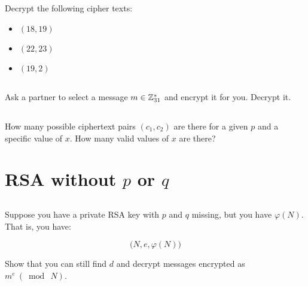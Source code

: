 \documentclass[12pt]{article}
\begin{document}
Decrypt the following cipher texts:

\begin{itemize}
\item $(18, 19)$ 
\item $(22, 23)$ 
\item $(19, 2)$ 
\end{itemize}

\subsection{}


Ask a partner to select a message $m \in \mathbb{Z}_{31}^*$ and encrypt it for you. Decrypt it.

\subsection{}

How many possible ciphertext pairs $(c_1, c_2)$ are there for a given $p$ and a specific value of $x$. How many valid values of $x$ are there?



\section{RSA without $p$ or $q$}

\subsection{}


\label{rsa_p_q}

Suppose you have a private RSA key with $p$ and $q$ missing, but you have $\varphi(N)$. That is, you have:

$$\Big(N, e, \varphi(N)\Big)$$

Show that you can still find $d$ and decrypt messages encrypted as $m^e ~(\bmod~N)$.


\subsection{}
\end{document}
